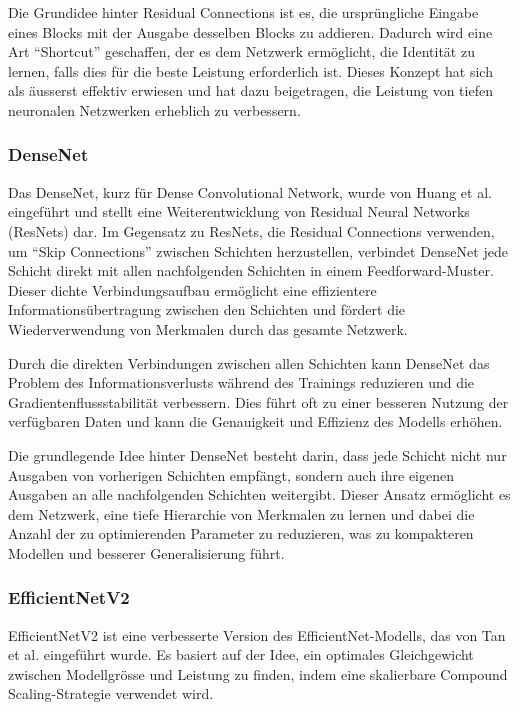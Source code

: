 Die Grundidee hinter Residual Connections ist es, die ursprüngliche Eingabe eines Blocks mit der Ausgabe desselben Blocks zu addieren. Dadurch wird eine Art "`Shortcut"' geschaffen, der es dem Netzwerk ermöglicht, die Identität zu lernen, falls dies für die beste Leistung erforderlich ist. Dieses Konzept hat sich als äusserst effektiv erwiesen und hat dazu beigetragen, die Leistung von tiefen neuronalen Netzwerken erheblich zu verbessern.

\subsubsection{DenseNet}
Das DenseNet, kurz für Dense Convolutional Network, wurde von Huang et al. \cite{huang_densely_2018} eingeführt und stellt eine Weiterentwicklung von Residual Neural Networks (ResNets) dar. Im Gegensatz zu ResNets, die Residual Connections verwenden, um "`Skip Connections"' zwischen Schichten herzustellen, verbindet DenseNet jede Schicht direkt mit allen nachfolgenden Schichten in einem Feedforward-Muster. Dieser dichte Verbindungsaufbau ermöglicht eine effizientere Informationsübertragung zwischen den Schichten und fördert die Wiederverwendung von Merkmalen durch das gesamte Netzwerk.

Durch die direkten Verbindungen zwischen allen Schichten kann DenseNet das Problem des Informationsverlusts während des Trainings reduzieren und die Gradientenflussstabilität verbessern. Dies führt oft zu einer besseren Nutzung der verfügbaren Daten und kann die Genauigkeit und Effizienz des Modells erhöhen.

Die grundlegende Idee hinter DenseNet besteht darin, dass jede Schicht nicht nur Ausgaben von vorherigen Schichten empfängt, sondern auch ihre eigenen Ausgaben an alle nachfolgenden Schichten weitergibt. Dieser Ansatz ermöglicht es dem Netzwerk, eine tiefe Hierarchie von Merkmalen zu lernen und dabei die Anzahl der zu optimierenden Parameter zu reduzieren, was zu kompakteren Modellen und besserer Generalisierung führt.

\subsubsection{EfficientNetV2}
EfficientNetV2 ist eine verbesserte Version des EfficientNet-Modells, das von Tan et al. \cite{tan_efficientnetv2_2021} eingeführt wurde. Es basiert auf der Idee, ein optimales Gleichgewicht zwischen Modellgrösse und Leistung zu finden, indem eine skalierbare Compound Scaling-Strategie verwendet wird.

